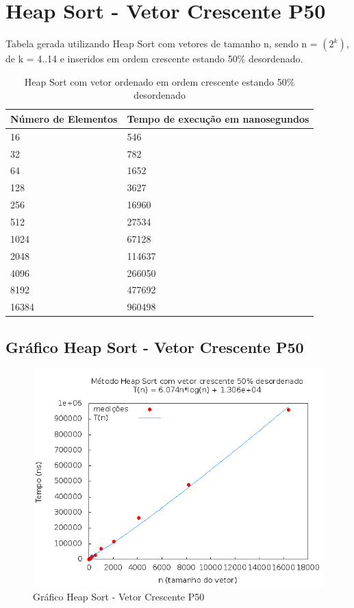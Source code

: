 \documentclass[12pt,a4paper,twoside]{report}
\begin{document}
\section{Heap Sort - Vetor Crescente P50}
Tabela gerada utilizando Heap Sort com vetores de tamanho n, sendo n = $(2^k)$, de k = 4..14 e inseridos em ordem crescente estando 50\% desordenado.
\begin{table}[H]
\centering
\caption{Heap Sort com vetor ordenado em ordem crescente estando 50\% desordenado}
\label{my-label}
\begin{tabular}{|l|l|}
\hline
\multicolumn{1}{|c|}{\textbf{Número de Elementos}} & \multicolumn{1}{c|}{\textbf{Tempo de execução em nanosegundos}} \\ \hline
16 & 546 \\ \hline
32 & 782 \\ \hline
64 & 1652 \\ \hline
128 & 3627 \\ \hline
256 & 16960 \\ \hline
512 & 27534 \\ \hline
1024 & 67128 \\ \hline
2048 & 114637 \\ \hline
4096 & 266050 \\ \hline
8192 & 477692 \\ \hline
16384 & 960498 \\ \hline
\end{tabular}
\end{table}

\subsection{Gráfico Heap Sort - Vetor Crescente P50}
\begin{figure}[H]
    \centering
    \includegraphics[width=0.7\linewidth]{graficos/HeapSort/vIntCrescenteP50/vIntCrescenteP50.png}
  \caption{Gráfico Heap Sort - Vetor Crescente P50}
\end{figure}
\end{document}
